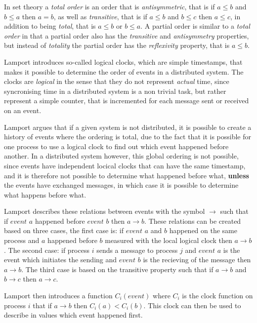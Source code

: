 		\newpar In set theory a \textit{total order} is an order that is \textit{antisymmetric}, that is if $a \leq b$ and $b \leq a$ then $a = b$, as well as \textit{transitive}, that is if $a \leq b$ and $b \leq c$ then $a \leq c$, in addition to being \textit{total}, that is $a \leq b$ or $b \leq a$. A partial order is similar to a \textit{total order} in that a partial order also has the \textit{transitive} and \textit{antisymmetry} properties, but instead of \textit{totality} the partial order has the \textit{reflexivity} property, that is $a \leq b$. 
		
		\newpar Lamport introduces so-called logical clocks, which are simple timestamps, that makes it possible to determine the order of events in a distributed system. The clocks are \textit{logical} in the sense that they do not represent \textit{actual} time, since syncronising time in a distributed system is a non trivial task, but rather represent a simple counter, that is incremented for each message sent or received on an event. 
		
		\newpar Lamport argues that if a given system is not distributed, it is possible to create a history of events where the ordering is total, due to the fact that it is possible for one process to use a logical clock to find out which event happened before another. In a distributed system however, this global ordering is not possible, since events have independent locical clocks that can have the same timestamp, and it is therefore not possible to determine what happened before what, \textbf{unless} the events have exchanged messages, in which case it is possible to determine what happens before what.
		
		\newpar Lamport describes these relations between events with the symbol $\rightarrow$ such that if $event$ $a$ happened before $event$ $b$ then $a \rightarrow b$. These relations can be created based on three cases, the first case is: if $event$ $a$ and $b$ happened on the same process and $a$ happened before $b$ measured with the local logical clock then $a \rightarrow b$. The second case: if process $i$ sends a message to process $j$ and $event$ $a$ is the event which initiates the sending and $event$ $b$ is the recieving of the message then $a \rightarrow b$. The third case is based on the transitive property such that if $a \rightarrow b$ and $b \rightarrow c$ then $a \rightarrow c$. 
		
		\newpar Lamport then introduces a function $C_i(event)$ where $C_i$ is the clock function on process $i$ that if $a \rightarrow b$ then $C_i(a) < C_i(b)$. This clock can then be used to describe in values which event happened first. 
		